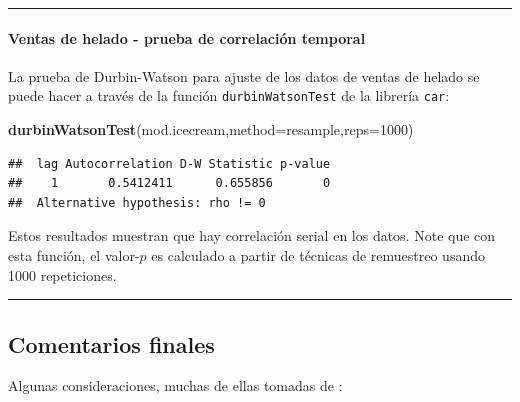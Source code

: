 \documentclass[
]{article}
\newenvironment{Shaded}{\begin{snugshade}}{\end{snugshade}}
\newcommand{\AttributeTok}[1]{\textcolor[rgb]{0.13,0.29,0.53}{#1}}
\newcommand{\DecValTok}[1]{\textcolor[rgb]{0.00,0.00,0.81}{#1}}
\newcommand{\FunctionTok}[1]{\textcolor[rgb]{0.13,0.29,0.53}{\textbf{#1}}}
\newcommand{\NormalTok}[1]{#1}
\newcommand{\StringTok}[1]{\textcolor[rgb]{0.31,0.60,0.02}{#1}}
\begin{document}
\rule{\textwidth}{0.4pt}

\hypertarget{ventas-de-helado---prueba-de-correlaciuxf3n-temporal}{%
\paragraph*{Ventas de helado - prueba de correlación temporal}\label{ventas-de-helado---prueba-de-correlaciuxf3n-temporal}}

La prueba de Durbin-Watson para ajuste de los datos de ventas de helado se puede hacer a través de la función \texttt{durbinWatsonTest} de la librería \texttt{car}:

\begin{Shaded}
\begin{Highlighting}[]
\FunctionTok{durbinWatsonTest}\NormalTok{(mod.icecream,}\AttributeTok{method=}\StringTok{\textquotesingle{}resample\textquotesingle{}}\NormalTok{,}\AttributeTok{reps=}\DecValTok{1000}\NormalTok{)}
\end{Highlighting}
\end{Shaded}

\begin{verbatim}
##  lag Autocorrelation D-W Statistic p-value
##    1       0.5412411      0.655856       0
##  Alternative hypothesis: rho != 0
\end{verbatim}

Estos resultados muestran que hay correlación serial en los datos. Note que con esta función, el valor-\(p\) es calculado a partir de técnicas de remuestreo usando 1000 repeticiones.

\rule{\textwidth}{0.4pt}

\hypertarget{comentarios-finales}{%
\subsection{Comentarios finales}\label{comentarios-finales}}

Algunas consideraciones, muchas de ellas tomadas de \citet{behar_validacion_2002}:
\end{document}
